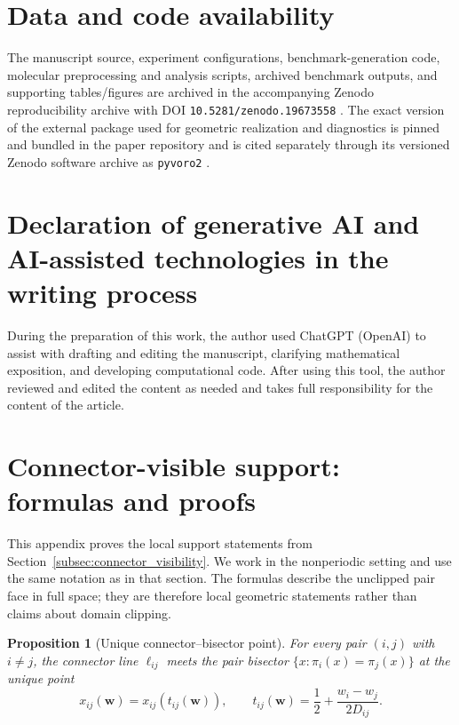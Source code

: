 \documentclass[preprint,12pt]{elsarticle}
\newtheorem{proposition}{Proposition}
\newcommand{\weights}{\mathbf{w}}
\begin{document}
\section*{Data and code availability}
The manuscript source, experiment configurations, benchmark-generation code,
molecular preprocessing and analysis scripts, archived benchmark outputs, and
supporting tables/figures are archived in the accompanying Zenodo
reproducibility archive with DOI \texttt{10.5281/zenodo.19673558}
\cite{powerfitRepro}. The exact version of the external package used for
geometric realization and diagnostics is pinned and bundled in the paper
repository and is cited separately through its versioned Zenodo software archive
as \texttt{pyvoro2} \cite{pyvoro2}.

\section*{Declaration of generative AI and AI-assisted technologies in the writing process}
During the preparation of this work, the author used ChatGPT (OpenAI) to assist
with drafting and editing the manuscript, clarifying mathematical exposition,
and developing computational code. After using this tool, the author reviewed and edited
the content as needed and takes full responsibility for the content of the article.


\clearpage
\appendix
\section{Connector-visible support: formulas and proofs}
\label{app:connector_visibility}

This appendix proves the local support statements from
Section~\ref{subsec:connector_visibility}. We work in the nonperiodic setting
and use the same notation as in that section. The formulas describe the
unclipped pair face in full space; they are therefore local geometric
statements rather than claims about domain clipping.

\begin{proposition}[Unique connector--bisector point]
\label{prop:connector_line_point}
For every pair $(i,j)$ with $i\neq j$, the connector line $\ell_{ij}$ meets the
pair bisector $\{x : \pi_i(x)=\pi_j(x)\}$ at the unique point
\begin{equation}
    x_{ij}(\weights)=x_{ij}(t_{ij}(\weights)),
    \qquad
    t_{ij}(\weights)=\frac12+\frac{w_i-w_j}{2D_{ij}}.
\end{equation}
\end{proposition}
\end{document}
